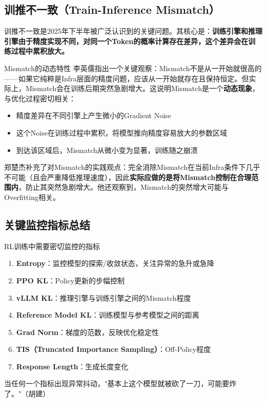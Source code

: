 \documentclass[a4paper]{article}
\begin{document}
\subsection{训推不一致（Train-Inference Mismatch）}

训推不一致是2025年下半年被广泛认识到的关键问题。其核心是：\textbf{训练引擎和推理引擎由于精度实现不同，对同一个Token的概率计算存在差异，这个差异会在训练过程中累积放大。}

\begin{warningbox}{Mismatch的动态特性}
李英儒指出一个关键观察：Mismatch不是从一开始就很高的——如果它纯粹是Infra层面的精度问题，应该从一开始就存在且保持恒定。但实际上，Mismatch会在训练后期突然急剧增大。这说明Mismatch是一个\textbf{动态现象}，与优化过程密切相关：
\begin{itemize}
    \item 精度差异在不同引擎上产生微小的Gradient Noise
    \item 这个Noise在训练过程中累积，将模型推向精度容易放大的参数区域
    \item 到达该区域后，Mismatch从微小变为显著，训练随之崩溃
\end{itemize}
\end{warningbox}

郑楚杰补充了对Mismatch的实践观点：完全消除Mismatch在当前Infra条件下几乎不可能（且会严重降低推理速度），因此\textbf{实际应做的是将Mismatch控制在合理范围内}，防止其突然急剧增大。他还观察到，Mismatch的突然增大可能与Overfitting相关。

\subsection{关键监控指标总结}

\begin{importantbox}{RL训练中需要密切监控的指标}
\begin{enumerate}
    \item \textbf{Entropy}：监控模型的探索/收敛状态，关注异常的急升或急降
    \item \textbf{PPO KL}：Policy更新的步幅控制
    \item \textbf{vLLM KL}：推理引擎与训练引擎之间的Mismatch程度
    \item \textbf{Reference Model KL}：训练模型与参考模型之间的距离
    \item \textbf{Grad Norm}：梯度的范数，反映优化稳定性
    \item \textbf{TIS（Truncated Importance Sampling）}：Off-Policy程度
    \item \textbf{Response Length}：生成长度变化
\end{enumerate}
当任何一个指标出现异常抖动，"基本上这个模型就被砍了一刀，可能要炸了。"（胡建）
\end{importantbox}
\end{document}
